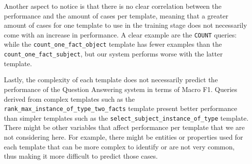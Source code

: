 Another aspect to notice is that there is no clear correlation between the performance and the amount 
of cases per template, meaning that a greater amount of cases for one template to use in the training 
stage does not necessarily come with an increase in performance. A clear example are the \texttt{COUNT} 
queries: while the \texttt{count\_one\_fact\_object} template has fewer examples than the 
\texttt{count\_one\_fact\_subject}, but our system performs worse with the latter template. 

Lastly, the complexity of each template does not necessarily predict the performance of the Question 
Answering system in terms of Macro F1. Queries derived from complex templates such as the 
\texttt{rank\_max\_instance\_of\_type\_two\_facts} template present better performance than simpler 
templates such as the \texttt{select\_subject\_instance\_of\_type} template. There might be other 
variables that affect performance per template that we are not considering here. For example, there 
might be entities or properties used for each template that can be more complex to identify or are 
not very common, thus making it more difficult to predict those cases.
